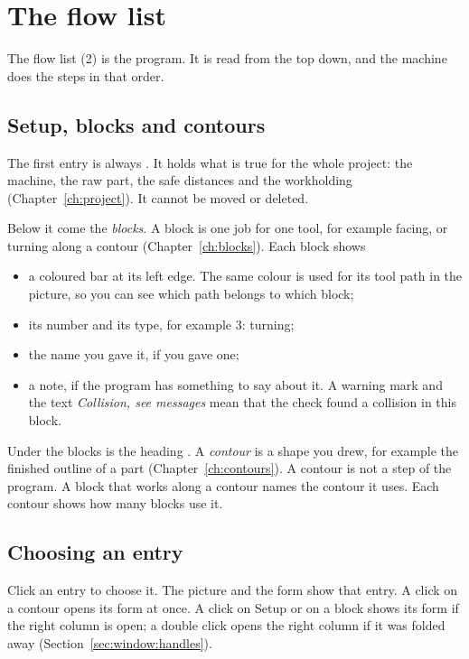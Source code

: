 \section{The flow list}\label{sec:window:flow}

The flow list (2) is the program. It is read from the top down, and the machine does the steps in that order.

\subsection{Setup, blocks and contours}
The first entry is always . It holds what is true for the whole project: the machine, the raw part, the safe distances and the workholding (Chapter~\ref{ch:project}). It cannot be moved or deleted.

Below it come the \emph{blocks}. A block is one job for one tool, for example facing, or turning along a contour (Chapter~\ref{ch:blocks}). Each block shows

\begin{itemize}
\item a coloured bar at its left edge. The same colour is used for its tool path in the picture, so you can see which path belongs to which block;
\item its number and its type, for example \textsf{3: turning};
\item the name you gave it, if you gave one;
\item a note, if the program has something to say about it. A warning mark and the text \emph{Collision, see messages} mean that the check found a collision in this block.
\end{itemize}

Under the blocks is the heading . A \emph{contour} is a shape you drew, for example the finished outline of a part (Chapter~\ref{ch:contours}). A contour is not a step of the program. A block that works along a contour names the contour it uses. Each contour shows how many blocks use it.

\subsection{Choosing an entry}
Click an entry to choose it. The picture and the form show that entry. A click on a contour opens its form at once. A click on Setup or on a block shows its form if the right column is open; a double click opens the right column if it was folded away (Section~\ref{sec:window:handles}).

